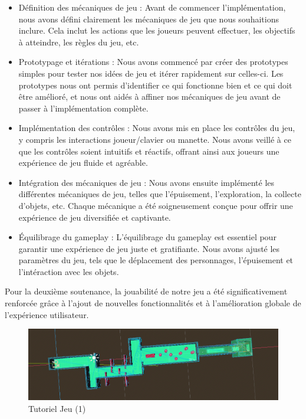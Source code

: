 \documentclass[
	article,			%
	11pt,				%
	oneside,			%
	a4paper,			%
	chapter=TITLE,
	french,			%
	sumario=tradicional
	]{base_nt}
\begin{document}
\begin{itemize}
    \item Définition des mécaniques de jeu : Avant de commencer l'implémentation, nous avons défini clairement les mécaniques de jeu que nous souhaitions inclure. Cela inclut les actions que les joueurs peuvent effectuer, les objectifs à atteindre, les règles du jeu, etc.
    \item Prototypage et itérations : Nous avons commencé par créer des prototypes simples pour tester nos idées de jeu et itérer rapidement sur celles-ci. Les prototypes nous ont permis d'identifier ce qui fonctionne bien et ce qui doit être amélioré, et nous ont aidés à affiner nos mécaniques de jeu avant de passer à l'implémentation complète.
    \item Implémentation des contrôles : Nous avons mis en place les contrôles du jeu, y compris les interactions joueur/clavier ou manette. Nous avons veillé à ce que les contrôles soient intuitifs et réactifs, offrant ainsi aux joueurs une expérience de jeu fluide et agréable.
    \item Intégration des mécaniques de jeu : Nous avons ensuite implémenté les différentes mécaniques de jeu, telles que l'épuisement, l'exploration, la collecte d'objets, etc. Chaque mécanique a été soigneusement conçue pour offrir une expérience de jeu diversifiée et captivante.
    \item Équilibrage du gameplay : L'équilibrage du gameplay est essentiel pour garantir une expérience de jeu juste et gratifiante. Nous avons ajusté les paramètres du jeu, tels que le déplacement des personnages, l'épuisement et l'intéraction avec les objets.
\end{itemize}

\newpage

Pour la deuxième soutenance, la jouabilité de notre jeu a été significativement renforcée grâce à l'ajout de nouvelles fonctionnalités et à l'amélioration globale de l'expérience utilisateur.

\begin{figure}[ht]
	\caption{Tutoriel Jeu (1)}
	\centering
	\includegraphics[width=1\linewidth]{paper23.png}
	\legend{}
	
\end{figure}
\end{document}
